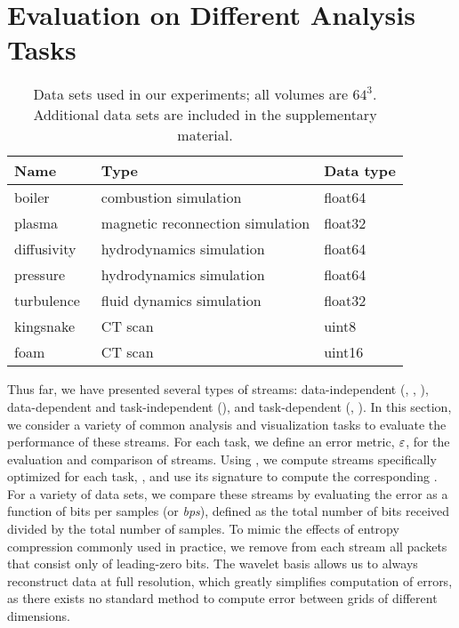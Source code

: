 \section{Evaluation on Different Analysis Tasks} \label{sec:analysis-tasks}

\begin{table}[b]
  \centering
	\begin{tabular}{l l l}
  \toprule
  Name & Type & Data type \\
  \midrule
  boiler & combustion simulation& float64\\
  plasma & magnetic reconnection simulation& float32\\
  diffusivity & hydrodynamics simulation& float64\\
  pressure & hydrodynamics simulation& float64\\
	turbulence~\cite{turbulence} & fluid dynamics simulation& float32\\
	kingsnake~\cite{kingsnake} & CT scan & uint8\\
	foam & CT scan & uint16\\
  \bottomrule
  \end{tabular}\label{tbl:data-sets}
  \vspace{-0.5em}
   \caption{Data sets used in our experiments; all volumes are $64^3$. Additional data sets are 
   included in the supplementary material.}
\end{table}

Thus far, we have presented several types of streams: data-independent (\slvl, \sbit, \swav),
data-dependent and task-independent (\smag), and task-dependent (\sopt, \ssig). In this section, we
consider a variety of common analysis and visualization tasks to evaluate the performance of these
streams. For each task, we define an error metric, $\err$, for the evaluation and comparison of
streams. Using , we compute streams specifically optimized for each task, \stkop,
and use its signature to compute the corresponding \stksg. For a variety of data sets, we compare
these streams by evaluating the error as a function of bits per samples (or \emph{bps}), defined as
the total number of bits received divided by the total number of samples. To mimic the effects of
entropy compression commonly used in practice, we remove from each stream all packets that consist
only of leading-zero bits. The wavelet basis allows us to always reconstruct data at full
resolution, which greatly simplifies computation of errors, as there exists no standard method to
compute error between grids of different dimensions.

